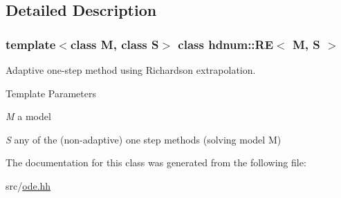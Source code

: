 \subsection{Detailed Description}
\subsubsection*{template$<$class M, class S$>$ class hdnum::RE$<$ M, S $>$}

Adaptive one-\/step method using Richardson extrapolation. 
\begin{DoxyTemplParams}{Template Parameters}
\item[{\em M}]a model \item[{\em S}]any of the (non-\/adaptive) one step methods (solving model M) \end{DoxyTemplParams}


The documentation for this class was generated from the following file:\begin{DoxyCompactItemize}
\item 
src/\hyperlink{ode_8hh}{ode.hh}\end{DoxyCompactItemize}
